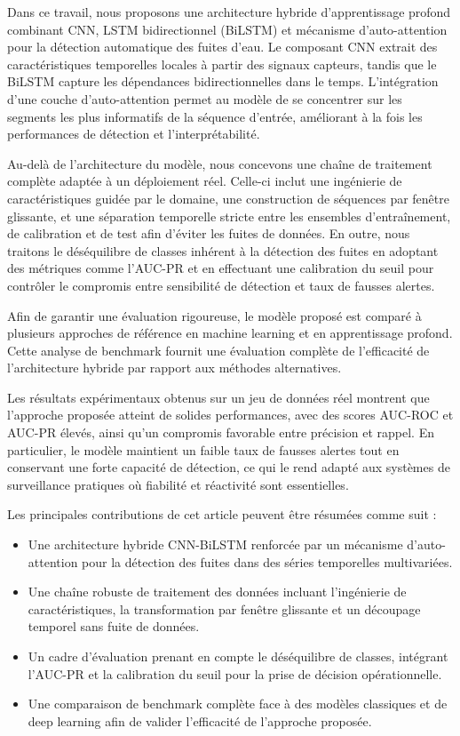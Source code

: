 Dans ce travail, nous proposons une architecture hybride d'apprentissage profond combinant CNN, LSTM bidirectionnel (BiLSTM) et mécanisme d'auto-attention pour la détection automatique des fuites d'eau. Le composant CNN extrait des caractéristiques temporelles locales à partir des signaux capteurs, tandis que le BiLSTM capture les dépendances bidirectionnelles dans le temps. L'intégration d'une couche d'auto-attention permet au modèle de se concentrer sur les segments les plus informatifs de la séquence d'entrée, améliorant à la fois les performances de détection et l'interprétabilité.

Au-delà de l'architecture du modèle, nous concevons une chaîne de traitement complète adaptée à un déploiement réel. Celle-ci inclut une ingénierie de caractéristiques guidée par le domaine, une construction de séquences par fenêtre glissante, et une séparation temporelle stricte entre les ensembles d'entraînement, de calibration et de test afin d'éviter les fuites de données. En outre, nous traitons le déséquilibre de classes inhérent à la détection des fuites en adoptant des métriques comme l'AUC-PR et en effectuant une calibration du seuil pour contrôler le compromis entre sensibilité de détection et taux de fausses alertes.

Afin de garantir une évaluation rigoureuse, le modèle proposé est comparé à plusieurs approches de référence en machine learning et en apprentissage profond. Cette analyse de benchmark fournit une évaluation complète de l'efficacité de l'architecture hybride par rapport aux méthodes alternatives.

Les résultats expérimentaux obtenus sur un jeu de données réel montrent que l'approche proposée atteint de solides performances, avec des scores AUC-ROC et AUC-PR élevés, ainsi qu'un compromis favorable entre précision et rappel. En particulier, le modèle maintient un faible taux de fausses alertes tout en conservant une forte capacité de détection, ce qui le rend adapté aux systèmes de surveillance pratiques où fiabilité et réactivité sont essentielles.

Les principales contributions de cet article peuvent être résumées comme suit :
\begin{itemize}
    \item Une architecture hybride CNN-BiLSTM renforcée par un mécanisme d'auto-attention pour la détection des fuites dans des séries temporelles multivariées.
    \item Une chaîne robuste de traitement des données incluant l'ingénierie de caractéristiques, la transformation par fenêtre glissante et un découpage temporel sans fuite de données.
    \item Un cadre d'évaluation prenant en compte le déséquilibre de classes, intégrant l'AUC-PR et la calibration du seuil pour la prise de décision opérationnelle.
    \item Une comparaison de benchmark complète face à des modèles classiques et de deep learning afin de valider l'efficacité de l'approche proposée.
\end{itemize}